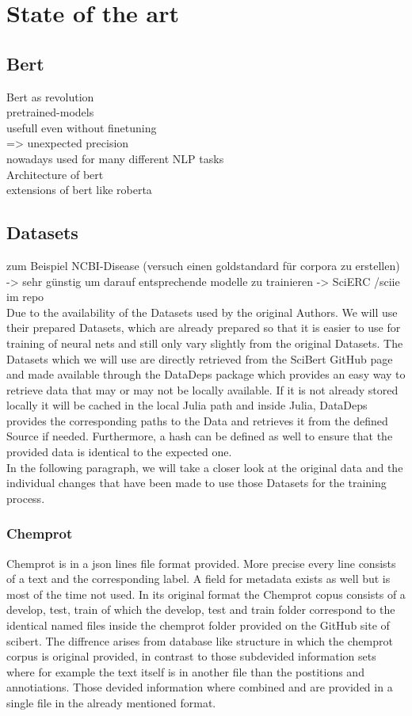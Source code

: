 \chapter{State of the art}
\section{Bert}
Bert as revolution\\
pretrained-models\\
usefull even without finetuning\\
=> unexpected precision\\

nowadays used for many different NLP tasks\\
Architecture of bert\\
extensions of bert like roberta\\
\section{Datasets}
zum Beispiel NCBI-Disease (versuch einen goldstandard für corpora zu erstellen)\\
-> sehr günstig um darauf entsprechende modelle zu trainieren \cite{Dogan2014}
-> SciERC /sciie im repo \cite{luan2018multitask}\\
Due to the availability of the Datasets used by the original Authors. We will use their prepared Datasets, which are already prepared so that it is easier to use for training of neural nets and still only vary slightly from the original Datasets. The Datasets which we will use are directly retrieved from the SciBert GitHub page and made available through the DataDeps package which provides an easy way to retrieve data that may or may not be locally available. If it is not already stored locally it will be cached in the local Julia path and inside Julia, DataDeps provides the corresponding paths to the Data and retrieves it from the defined Source if needed. Furthermore, a hash can be defined as well to ensure that the provided data is identical to the expected one.\cite{White2019}\\
In the following paragraph, we will take a closer look at the original data and the individual changes that have been made to use those Datasets for the training process.
\subsection{Chemprot}
Chemprot is in a json lines file format provided. More precise every line consists of a text and the corresponding label. A field for metadata exists as well but is most of the time not used. In its original format the Chemprot copus consists of a develop, test, train of which the develop, test and train folder correspond to the identical named files inside the chemprot folder provided on the GitHub site of scibert. The diffrence arises from database like structure in which the chemprot corpus is original provided, in contrast to those subdevided information sets where for example the text itself is in another file than the postitions and annotiations. Those devided information where combined and are provided in a single file in the already mentioned format. \cite{Beltagy2019,Wang2016}